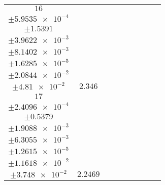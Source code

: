 \documentclass[8pt]{article}
\begin{document}
\begin{longtable}[l]{c c c c c c c c c}
$\num{16}$ & \begin{tabular}[c]{@{}c@{}}$\num{2.7539e-2}$ \\ $\pm\num{5.9535e-4}$\end{tabular} & \begin{tabular}[c]{@{}c@{}}$\num{-0.3402}$ \\ $\pm\num{1.5391}$\end{tabular} & \begin{tabular}[c]{@{}c@{}}$\num{0.85633}$ \\ $\pm\num{3.9622e-3}$\end{tabular} & \begin{tabular}[c]{@{}c@{}}$\num{3.6276e+3}$ \\ $\pm\num{8.1402e-3}$\end{tabular} & \begin{tabular}[c]{@{}c@{}}$\num{7.2572}$ \\ $\pm\num{1.6285e-5}$\end{tabular} & \begin{tabular}[c]{@{}c@{}}$\num{1.1451}$ \\ $\pm\num{2.0844e-2}$\end{tabular} & \begin{tabular}[c]{@{}c@{}}$\num{4.0911}$ \\ $\pm\num{4.81e-2}$\end{tabular} & $\num{2.346}$\\
$\num{17}$ & \begin{tabular}[c]{@{}c@{}}$\num{2.6892e-2}$ \\ $\pm\num{2.4096e-4}$\end{tabular} & \begin{tabular}[c]{@{}c@{}}$\num{0.84776}$ \\ $\pm\num{0.5379}$\end{tabular} & \begin{tabular}[c]{@{}c@{}}$\num{7.029}$ \\ $\pm\num{1.9088e-3}$\end{tabular} & \begin{tabular}[c]{@{}c@{}}$\num{3.6338e+3}$ \\ $\pm\num{6.3055e-3}$\end{tabular} & \begin{tabular}[c]{@{}c@{}}$\num{7.2695}$ \\ $\pm\num{1.2615e-5}$\end{tabular} & \begin{tabular}[c]{@{}c@{}}$\num{1.1251}$ \\ $\pm\num{1.1618e-2}$\end{tabular} & \begin{tabular}[c]{@{}c@{}}$\num{4.0318}$ \\ $\pm\num{3.748e-2}$\end{tabular} & $\num{2.2469}$\\

\end{longtable}
\end{document}
